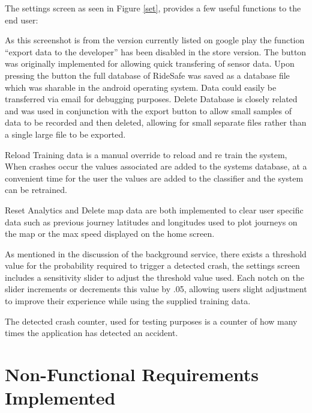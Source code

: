The settings screen as seen in Figure \ref{set}, provides a few useful functions to the end user:

As this screenshot is from the version currently listed on google play the function “export data to the developer” has been disabled in the store version.  The button was originally implemented for allowing quick transfering of sensor data. Upon pressing the button the full database of RideSafe was saved as a database file which was sharable in the android operating system. Data could easily be transferred via email for debugging purposes. Delete Database is closely related and was used in conjunction with the export button to allow small samples of data to be recorded and then deleted, allowing for small separate files rather than a single large file to be exported.

Reload Training data is a manual override to reload and re train the system,  When crashes occur the values associated are added to the systems database, at a convenient time for the user the values are added to the classifier and the system can be retrained.

Reset Analytics and Delete map data are both implemented to clear user specific data such as previous journey latitudes and longitudes used to plot journeys on the map or the max speed displayed on the home screen.

As mentioned in the discussion of the background service, there exists a threshold value for the probability required to trigger a detected crash, the settings screen includes a sensitivity slider to adjust the threshold value used. Each notch on the slider increments or decrements this value by .05, allowing users slight adjustment to improve their experience while using the supplied training data.

The detected crash counter, used for testing purposes is a counter of how many times the application has detected an accident. 


\section{Non-Functional Requirements Implemented}
\vspace{3cm}


